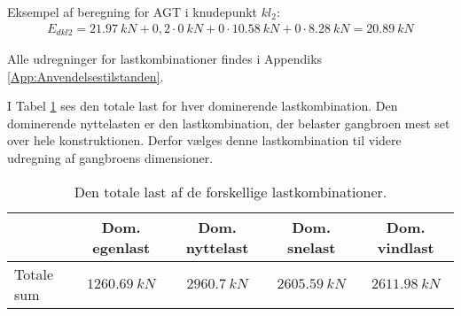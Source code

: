 Eksempel af beregning for AGT i knudepunkt $ kl_{2} $:
\begin{align*}
E_{dkl2} = \SI{21,97}{kN} + 0,2 \cdot \SI{0}{kN} + 0 \cdot \SI{10,58}{kN} + 0 \cdot \SI{8,28}{kN} = \SI{20,89}{kN}
\end{align*}

Alle udregninger for lastkombinationer findes i Appendiks \ref{App:Anvendelsestilstanden}.

I Tabel \ref{tab:dominerendelaster} ses den totale last for hver dominerende lastkombination. Den dominerende nyttelasten er den lastkombination, der belaster gangbroen mest set over hele konstruktionen. Derfor vælges denne lastkombination til videre udregning af gangbroens dimensioner.

\begin{table}[H]
\centering
\label{tab:dominerendelaster}
\begin{tabular}{|l|c|c|c|c|}
\hline
\textbf{}  & \textbf{Dom. egenlast} & \textbf{Dom. nyttelast} & \textbf{Dom. snelast} & \textbf{Dom. vindlast} \\ \hline
Totale sum & $\SI{1260,69}{kN}$     & $\SI{2960,7}{kN}$      & $\SI{2605,59}{kN}$    & $\SI{2611,98}{kN}$     \\ \hline
\end{tabular}
\caption{Den totale last af de forskellige lastkombinationer.}
\end{table}















